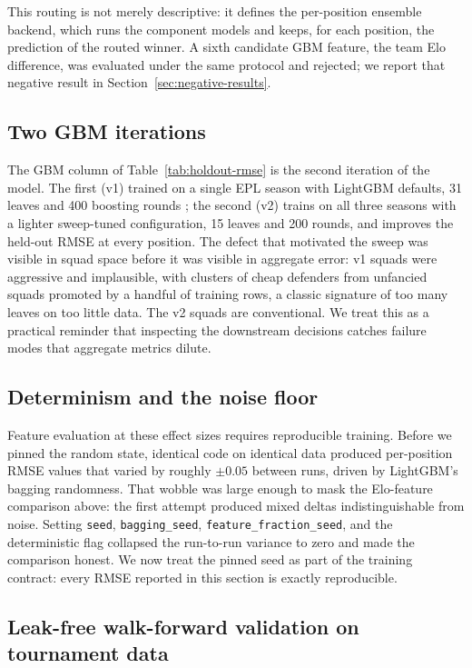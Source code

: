 This routing is not merely descriptive: it defines the per-position
ensemble backend, which runs the component models and keeps, for
each position, the prediction of the routed winner. A sixth candidate
GBM feature, the team Elo difference, was evaluated under the same
protocol and rejected; we report that negative result in
Section~\ref{sec:negative-results}.

\subsection{Two GBM iterations}
\label{sec:validation-gbm}

The GBM column of Table~\ref{tab:holdout-rmse} is the second
iteration of the model. The first (v1) trained on a single EPL season
with LightGBM defaults, 31 leaves and 400 boosting rounds
\citep{ke2017lightgbm}; the second (v2) trains on all three seasons
with a lighter sweep-tuned configuration, 15 leaves and 200 rounds,
and improves the held-out RMSE at every position. The defect that
motivated the sweep was visible in squad space before it was visible
in aggregate error: v1 squads were aggressive and implausible, with
clusters of cheap defenders from unfancied squads promoted by a
handful of training rows, a classic signature of too many leaves on
too little data. The v2 squads are conventional. We treat this as a
practical reminder that inspecting the downstream decisions catches
failure modes that aggregate metrics dilute.

\subsection{Determinism and the noise floor}
\label{sec:validation-determinism}

Feature evaluation at these effect sizes requires reproducible
training. Before we pinned the random state, identical code on
identical data produced per-position RMSE values that varied by
roughly $\pm 0.05$ between runs, driven by LightGBM's bagging
randomness. That wobble was large enough to mask the Elo-feature
comparison above: the first attempt produced mixed deltas
indistinguishable from noise. Setting \texttt{seed},
\texttt{bagging\_seed}, \texttt{feature\_fraction\_seed}, and the
deterministic flag collapsed the run-to-run variance to zero and made
the comparison honest. We now treat the pinned seed as part of the
training contract: every RMSE reported in this section is exactly
reproducible.

\subsection{Leak-free walk-forward validation on tournament data}
\label{sec:validation-walkforward}

